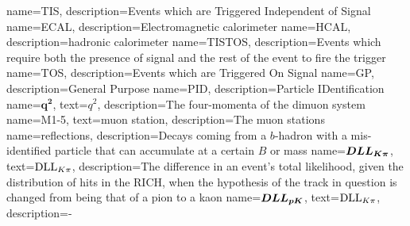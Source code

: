                  {
                   name=TIS,
                   description={Events which are Triggered Independent of Signal}
                                    }
                 {
                   name=ECAL,
                   description={Electromagnetic calorimeter}
                                    }
                 {
                   name=HCAL,
                   description={hadronic calorimeter}
                                    }                                    
                 {
                   name=TISTOS,
                   description={Events which require both the presence of signal and the rest of the event to fire the trigger}
                                    }                                    
                 {
                   name=TOS,
                   description={Events which are Triggered On Signal}
                                    }                                    
                 {
                   name=GP,
                   description={General Purpose}                                 }                  
                 {
                  name=PID,
                  description={Particle IDentification} 
                 }                 
                 {
                   name=$\mathbold{q^{2}}$,
                  text=$q^{2}$,
                  description={The four-momenta of the dimuon system}
                 }
                 {
                   name=M1-5,
                  text=muon station,
                   description={The muon stations}
                 }
                 {
                   name=reflections,
                                      description={Decays coming from a $b$-hadron with a mis-identified particle that can accumulate at a certain $B$ or \Lb mass}
                 }                 
                 {
                   name=$\mathbold{DLL_{\kaon\pi}}$,
                  text=$\mathrm{DLL}_{{K}{\pi}}$,
                 description={The difference in an event’s total likelihood, given the distribution of hits in the RICH, when the hypothesis of the track in question is changed from being that of a pion to a kaon
}}
                 {
                   name=$\mathbold{DLL_{\proton\kaon}}$,
                  text=$\mathrm{DLL}_{{K}{\pi}}$,
                 description={\dllppi-\dllkpi}}
